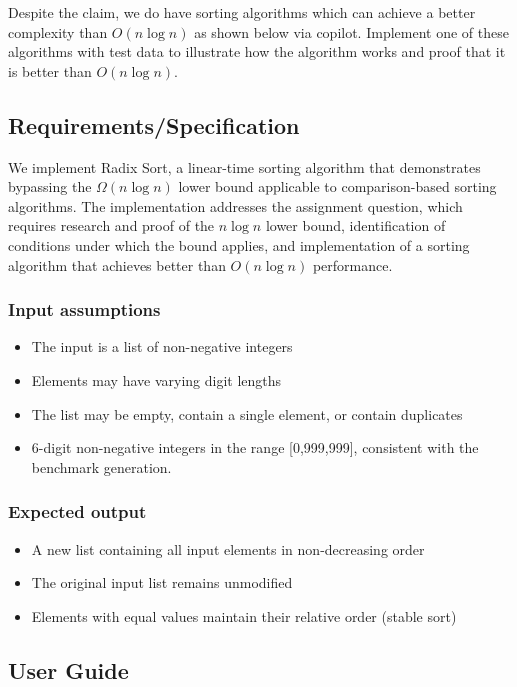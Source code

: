 \documentclass[12pt]{article}
\begin{document}
\noindent Despite the claim, we do have sorting algorithms which can achieve a better complexity than $O(n \log n)$ as shown below via copilot. Implement one of these algorithms with test data to illustrate how the algorithm works and proof that it is better than $O(n \log n)$.

\subsection{Requirements/Specification}

We implement Radix Sort, a linear-time sorting algorithm that demonstrates bypassing the $\Omega(n \log n)$ lower bound applicable to comparison-based sorting algorithms. The implementation addresses the assignment question, which requires research and proof of the $n \log n$ lower bound, identification of conditions under which the bound applies, and implementation of a sorting algorithm that achieves better than $O(n \log n)$ performance.

\subsubsection{Input assumptions}
\begin{itemize}
    \item The input is a list of non-negative integers
    \item Elements may have varying digit lengths
    \item The list may be empty, contain a single element, or contain duplicates
    \item 6-digit non-negative integers in the range [0,999,999], consistent with the benchmark generation.
\end{itemize}

\subsubsection{Expected output}
\begin{itemize}
    \item A new list containing all input elements in non-decreasing order
    \item The original input list remains unmodified
    \item Elements with equal values maintain their relative order (stable sort)
\end{itemize}

\newpage
\subsection{User Guide}
\end{document}
